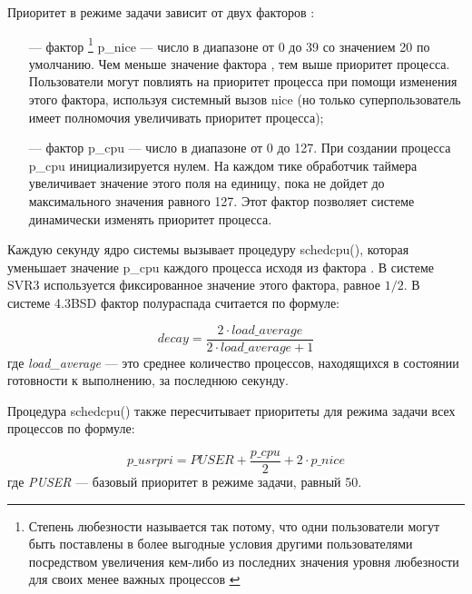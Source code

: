 \newpage

Приоритет в режиме задачи зависит от двух факторов \cite{unix5}:

\begin{itemize}
    \item[---] фактор \footnote{Степень любезности называется так потому, что одни пользователи могут быть поставлены в более выгодные условия другими пользователями посредством увеличения кем-либо из последних значения уровня любезности для своих менее важных процессов \cite{unix5}} {\ttfamily p\_nice} --- число в диапазоне от 0 до 39 со значением 20 по умолчанию. Чем меньше значение фактора , тем выше приоритет процесса. Пользователи могут повлиять на приоритет процесса при помощи изменения этого фактора, используя системный вызов nice (но только суперпользователь имеет полномочия увеличивать приоритет процесса);

    \item[---] фактор  {\ttfamily p\_cpu} --- число в диапазоне от 0 до 127. При создании процесса {\ttfamily p\_cpu} инициализируется нулем. На каждом тике обработчик таймера увеличивает значение этого поля на единицу, пока не дойдет до максимального значения равного 127. Этот фактор позволяет системе динамически изменять приоритет процесса.
\end{itemize}

Каждую секунду ядро системы вызывает процедуру {\ttfamily schedcpu()}, которая уменьшает значение {\ttfamily p\_cpu} каждого процесса исходя из фактора . 
В системе SVR3 используется фиксированное значение этого фактора, равное $1/2$. В системе 4.3BSD фактор полураспада считается по формуле:

\begin{equation}
\label{eq:ref1}
decay = \frac{2 \cdot load\_average}{2 \cdot load\_average + 1}
\end{equation} где
\textit{load\_average} --- это среднее количество процессов, находящихся в состоянии готовности к выполнению, за последнюю секунду.

Процедура {\ttfamily schedcpu()} также пересчитывает приоритеты для режима задачи всех процессов по формуле:

\begin{equation}
\label{eq:ref2}
p\_usrpri = PUSER + \frac{p\_cpu}{2} + 2 \cdot p\_nice
\end{equation}где \textit{PUSER} --- базовый приоритет в режиме задачи, равный 50.

